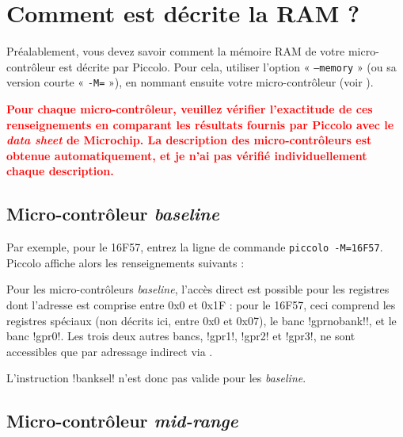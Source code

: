 
\cleardoublepage


\thispagestyle{empty}








\section{Comment est décrite la RAM ?}

Préalablement, vous devez savoir comment la mémoire RAM de votre micro-contrôleur est décrite par Piccolo. Pour cela, utiliser l'option « \texttt{--memory} » (ou sa version courte « \texttt{-M=} »), en nommant ensuite votre micro-contrôleur (voir ).

\textcolor{red}{\bf Pour chaque micro-contrôleur, veuillez vérifier l'exactitude de ces renseignements en comparant les résultats fournis par Piccolo avec le \emph{data sheet} de Microchip. La description des micro-contrôleurs est obtenue automatiquement, et je n'ai pas vérifié individuellement chaque description.}



\subsection{Micro-contrôleur \emph{baseline}}

Par exemple, pour le 16F57, entrez la ligne de commande \texttt{piccolo -M=16F57}. Piccolo affiche alors les renseignements suivants :



Pour les micro-contrôleurs \emph{baseline}, l'accès direct est possible pour les registres dont l'adresse est comprise entre 0x0 et 0x1F : pour le 16F57, ceci comprend les registres spéciaux (non décrits ici, entre 0x0 et 0x07), le banc \pic!gprnobank!\pic!, et le banc \pic!gpr0!. Les trois deux autres bancs, \pic!gpr1!, \pic!gpr2! et \pic!gpr3!, ne sont accessibles que par adressage indirect via .

L'instruction \pic!banksel! n'est donc pas valide pour les \emph{baseline}.

\subsection{Micro-contrôleur \emph{mid-range}}

